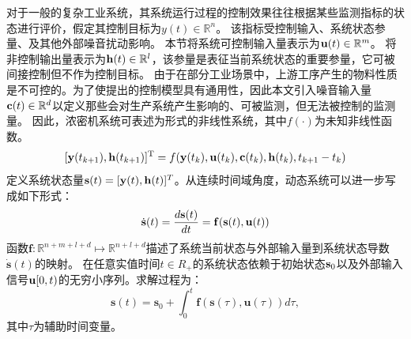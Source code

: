 对于一般的复杂工业系统，其系统运行过程的控制效果往往根据某些监测指标的状态进行评价，假定其控制目标为$y(t) \in \mathbb{R}^n$。
该指标受控制输入、系统状态参量、及其他外部噪音扰动影响。
本节将系统可控制输入量表示为$\mathbf u(t) \in \mathbb{R}^m$。
将非控制输出量表示为$\mathbf h(t) \in \mathbb{R}^l$，该参量是表征当前系统状态的重要参量，它可被间接控制但不作为控制目标。
由于在部分工业场景中，上游工序产生的物料性质是不可控的。为了使提出的控制模型具有通用性，因此本文引入噪音输入量$\mathbf c(t) \in\mathbb{R}^d$以定义那些会对生产系统产生影响的、可被监测，但无法被控制的监测量。
因此，浓密机系统可表述为形式的非线性系统，其中$f
( \cdot )$为未知非线性函数。
\begin{equation}\label{equ:system_dynamic_dt}
    [\mathbf y ( t_{k + 1} ), \mathbf h(t_{k+1})]^{\rm T} = f ( \mathbf y(t_k), \mathbf u ( t_k ) ,\mathbf c ( t_k ) ,\mathbf h(t_k), t_{k+1}-t_k)
\end{equation}
定义系统状态量$\mathbf s(t)=[\mathbf y(t), \mathbf h(t)]^T$。从连续时间域角度，动态系统可以进一步写成如下形式：
\begin{equation}
\dot{\mathbf{s}}(t)=\frac{d \mathbf{s}(t)}{d t}=\mathbf{f}(\mathbf{s}(t), \mathbf{u}(t))
\end{equation}
函数$\mathbf{f}: \mathbb{R}^{n+m+l+d} \mapsto \mathbb{R}^{n+l+d}$描述了系统当前状态与外部输入量到系统状态导数$\boldsymbol{\dot s}(t)$的映射。
在任意实值时间$t\in R_{+}$的系统状态依赖于初始状态$\mathbf s_0$以及外部输入信号$\mathbf u[0,t)$的无穷小序列。求解过程为：
\begin{equation}
\label{equ:system_dynamic_ct}
\mathbf{s}(t)=\mathbf{s}_{0}+\int_{0}^{t} \mathbf{f}(\mathbf{s}(\tau), \mathbf{u}(\tau)) d \tau,
\end{equation}
其中$\tau$为辅助时间变量。


